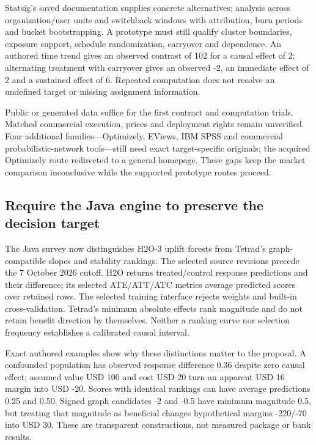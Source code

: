 Statsig's saved documentation supplies concrete alternatives: analysis
across organization/user units and switchback windows with attribution,
burn periods and bucket bootstrapping. A prototype must still qualify
cluster boundaries, exposure support, schedule randomization, carryover
and dependence. An authored time trend gives an observed contrast of 102
for a causal effect of 2; alternating treatment with carryover gives an
observed -2, an immediate effect of 2 and a sustained effect of 6.
Repeated computation does not resolve an undefined target or missing
assignment information.
\citep{exec20_network_statsig_types,exec20_network_statsig_units,exec20_network_statsig_switchback,exec20_network_reference}

Public or generated data suffice for the first contract and computation
trials. Matched commercial execution, prices and deployment rights
remain unverified. Four additional families---Optimizely, EViews, IBM
SPSS and commercial probabilistic-network tools---still need exact
target-specific originals; the acquired Optimizely route redirected to a
general homepage. These gaps keep the market comparison inconclusive
while the supported prototype routes proceed.

\hypertarget{require-the-java-engine-to-preserve-the-decision-target}{%
\subsection{Require the Java engine to preserve the decision
target}\label{require-the-java-engine-to-preserve-the-decision-target}}

The Java survey now distinguishes H2O-3 uplift forests from Tetrad's
graph-compatible slopes and stability rankings. The selected source
revisions precede the 7 October 2026 cutoff. H2O returns treated/control
response predictions and their difference; its selected ATE/ATT/ATC
metrics average predicted scores over retained rows. The selected
training interface rejects weights and built-in cross-validation.
Tetrad's minimum absolute effects rank magnitude and do not retain
benefit direction by themselves. Neither a ranking curve nor selection
frequency establishes a calibrated causal interval.
\citep{exec20_javaeffects_h2o,exec20_javaeffects_tetrad}

Exact authored examples show why these distinctions matter to the
proposal. A confounded population has observed response difference 0.36
despite zero causal effect; assumed value USD 100 and cost USD 20 turn
an apparent USD 16 margin into USD -20. Scores with identical rankings
can have average predictions 0.25 and 0.50. Signed graph candidates -2
and -0.5 have minimum magnitude 0.5, but treating that magnitude as
beneficial changes hypothetical margins -220/-70 into USD 30. These are
transparent constructions, not measured package or bank results.
\citep{exec20_javaeffects_reference}

